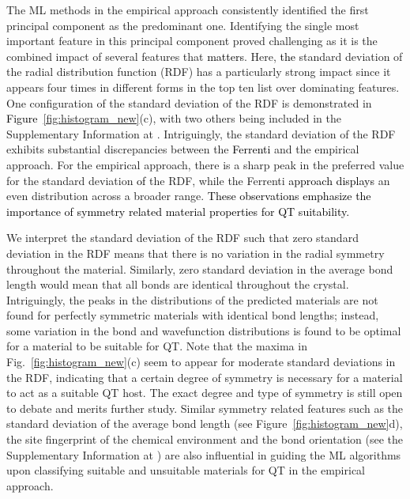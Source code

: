 \documentclass[superscriptaddress,unsortedaddress,
 amsmath,amssymb,
 aps,
]{revtex4-2}
\newcommand{\mrk}[1]{\textcolor{black}{#1}}
\begin{document}
The ML methods in the empirical approach consistently identified the first principal component as the predominant one. Identifying the single most important feature in this principal component proved challenging as it is the combined impact of several features that \mrk{matters}. 
Here, \mrk{the} standard deviation of the radial distribution function (RDF) has a  particularly strong impact since it appears four times in different forms in the top ten list over dominating features. One configuration of the standard deviation of the RDF is demonstrated in \mrk{Figure}~\ref{fig:histogram_new}(c), with two others being included in the Supplementary Information at \cite{supplementary}. Intriguingly, the standard deviation of the RDF exhibits substantial discrepancies between the \mrk{Ferrenti} and the empirical approach. For the empirical approach, there is a sharp peak in the preferred value for the standard deviation \mrk{of} the RDF, while the Ferrenti \mrk{approach displays} an even distribution across a broader range. 
\mrk{These observations emphasize the importance of symmetry related material properties for QT suitability. } 

We interpret the standard deviation  of the RDF such that zero standard deviation in the RDF means that there is no variation in the radial symmetry throughout the material. Similarly, zero standard deviation in the average bond length would mean that all bonds are identical throughout the crystal. Intriguingly, the peaks in the distributions of the predicted materials are not found for perfectly symmetric materials with identical bond lengths; instead, some variation in the bond and wavefunction distributions is found to be optimal for a material to be suitable for QT.  
Note that the maxima in  Fig.~\ref{fig:histogram_new}(c) seem to appear for moderate standard deviations in the RDF, indicating that a certain degree of symmetry is necessary for a material to act as a suitable QT host. The exact degree and type of symmetry is still open to debate and merits further study. 
Similar symmetry related features such as the standard deviation of the average bond length (see Figure~\ref{fig:histogram_new}d), the site fingerprint of the chemical environment and the bond orientation (see the Supplementary Information at \cite{supplementary}) are also influential in guiding the ML algorithms upon classifying suitable and unsuitable materials for QT in the empirical approach. 
\end{document}
